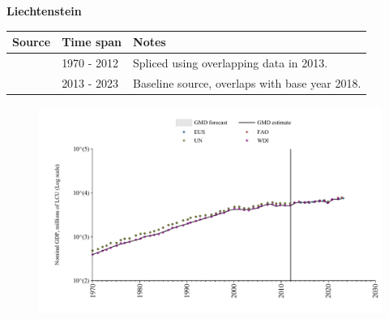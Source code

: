 \documentclass[12pt,a4paper,landscape]{article}
\begin{document}
\begin{adjustbox}{max totalsize={\paperwidth}{\paperheight},center}
\begin{minipage}[t][\textheight][t]{\textwidth}
\vspace*{0.5cm}
{}
\begin{center}
{\Large\bfseries Liechtenstein}
\end{center}
\vspace{0.5cm}
\begin{table}[H]
\centering
\small
\begin{tabular}{|l|l|l|}
\hline
\textbf{Source} & \textbf{Time span} & \textbf{Notes} \\
\hline
\rowcolor{white}\cite{WDI}& 1970 - 2012 &Spliced using overlapping data in 2013.\\
\rowcolor{lightgray}\cite{EUS}& 2013 - 2023 &Baseline source, overlaps with base year 2018.\\
\hline
\end{tabular}
\end{table}
\begin{figure}[H]
\centering
\includegraphics[width=\textwidth,height=0.6\textheight,keepaspectratio]{graphs/LIE_nGDP.pdf}
\end{figure}
\end{minipage}
\end{adjustbox}
\end{document}
